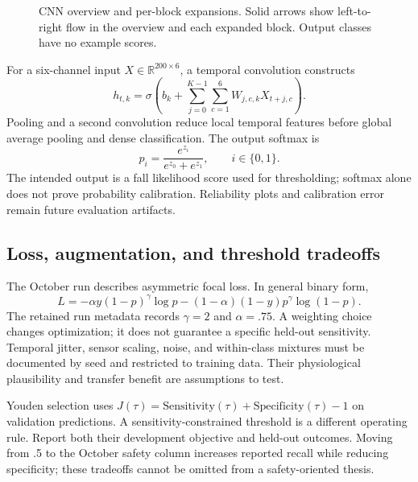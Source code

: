 \begin{figure}[H]
\caption{CNN overview and per-block expansions. Solid arrows show left-to-right flow in the overview and each expanded block. Output classes have no example scores.}
\label{fig:cnn-architecture}
\end{figure}
For a six-channel input $X\in\mathbb{R}^{200\times6}$, a temporal convolution constructs
\[
 h_{t,k}=\sigma\left(b_k+\sum_{j=0}^{K-1}\sum_{c=1}^{6}W_{j,c,k}X_{t+j,c}\right).
\]
Pooling and a second convolution reduce local temporal features before global average pooling and dense classification. The output softmax is
\[
 p_i=\frac{e^{z_i}}{e^{z_0}+e^{z_1}},\qquad i\in\{0,1\}.
\]
The intended output is a fall likelihood score used for thresholding; softmax alone does not prove probability calibration. Reliability plots and calibration error remain future evaluation artifacts.

\subsection{Loss, augmentation, and threshold tradeoffs}
The October run describes asymmetric focal loss. In general binary form,
\[
 L=-\alpha y(1-p)^\gamma\log p
 -(1-\alpha)(1-y)p^\gamma\log(1-p).
\]
The retained run metadata records $\gamma=2$ and $\alpha=.75$. A weighting choice changes optimization; it does not guarantee a specific held-out sensitivity. Temporal jitter, sensor scaling, noise, and within-class mixtures must be documented by seed and restricted to training data. Their physiological plausibility and transfer benefit are assumptions to test.

Youden selection uses $J(\tau)=\mathrm{Sensitivity}(\tau)+\mathrm{Specificity}(\tau)-1$ on validation predictions. A sensitivity-constrained threshold is a different operating rule. Report both their development objective and held-out outcomes. Moving from .5 to the October safety column increases reported recall while reducing specificity; these tradeoffs cannot be omitted from a safety-oriented thesis.

